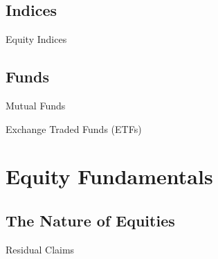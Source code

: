 \documentclass[10pt]{article}
\begin{document}
  \subsection{Indices}

    \begin{core}{Equity Indices}





    \end{core}


  \subsection{Funds}

    \begin{core}{Mutual Funds}

    \end{core}

    \begin{core}{Exchange Traded Funds (ETFs)}

    \end{core}

\section{Equity Fundamentals}

  \subsection{The Nature of Equities}

    \begin{core}{Residual Claims}




    \end{core}
\end{document}

